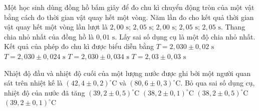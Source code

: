 \begin{vd}
Một học sinh dùng đồng hồ bấm giây để đo chu kì chuyển động tròn của một vật bằng cách đo thời gian vật quay hết một vòng. Năm lần đo cho kết quả thời gian vật quay hết một vòng lần lượt là $2{,}00\text{ s}$; $2{,}05\text{ s}$; $2{,}00\text{ s}$; $2{,}05\text{ s}$; $2{,}05\text{ s}$. Thang chia nhỏ nhất của đồng hồ là $0{,}01\text{ s}$. Lấy sai số dụng cụ là một độ chia nhỏ nhất. Kết quả của phép đo chu kì được biểu diễn bằng
\choice
{$T = 2{,}030 \pm 0{,}02\text{ s}$}
{$T = 2{,}030 \pm 0{,}024\text{ s}$}
{\True $T = 2{,}030 \pm 0{,}034\text{ s}$}
{$T = 2{,}03 \pm 0{,}03\text{ s}$}
\end{vd}

\begin{vd}
Nhiệt độ đầu và nhiệt độ cuối của một lượng nước được ghi bởi một người quan sát trên nhiệt kế là $(42{,}4 \pm 0{,}2)^\circ\text{C}$ và $(80{,}6 \pm 0{,}3)^\circ\text{C}$. Bỏ qua sai số dụng cụ, nhiệt độ của nước đã tăng
\choice
{$(39{,}2 \pm 0{,}5)^\circ\text{C}$}
{$(38{,}2 \pm 0{,}1)^\circ\text{C}$}
{\True $(38{,}2 \pm 0{,}5)^\circ\text{C}$}
{$(39{,}2 \pm 0{,}1)^\circ\text{C}$}
\end{vd}

